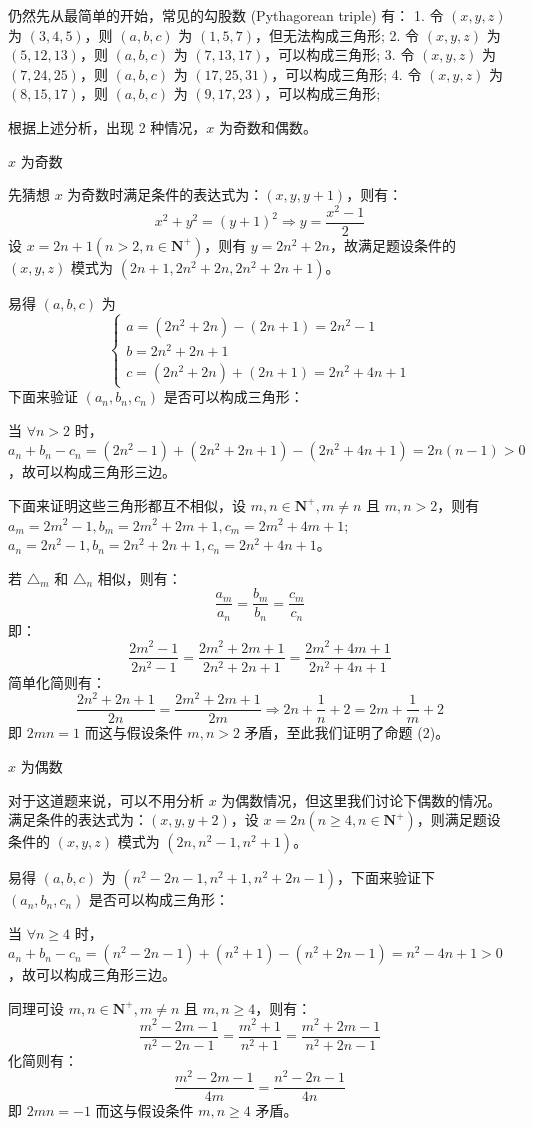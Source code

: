 \begin{solutions}
仍然先从最简单的开始，常见的勾股数 (Pythagorean triple) 有：
1. 令 $(x,y,z)$ 为 $(3,4,5)$，则 $(a,b,c)$ 为 $(1,5,7)$，但无法构成三角形;
2. 令 $(x,y,z)$ 为 $(5,12,13)$，则 $(a,b,c)$ 为 $(7,13,17)$，可以构成三角形;
3. 令 $(x,y,z)$ 为 $(7,24,25)$，则 $(a,b,c)$ 为 $(17,25,31)$，可以构成三角形;
4. 令 $(x,y,z)$ 为 $(8,15,17)$，则 $(a,b,c)$ 为 $(9,17,23)$，可以构成三角形;

根据上述分析，出现 2 种情况，$x$ 为奇数和偶数。

$x$ 为奇数

先猜想 $x$ 为奇数时满足条件的表达式为：$(x,y,y+1)$，则有：
$$
x^2+y^2=(y+1)^2 \Rightarrow y=\frac{x^2-1}{2}
$$
设 $x=2n+1(n>2, n\in \mathbf{N}^+)$，则有 $y=2n^2+2n$，故满足题设条件的 $(x,y,z)$ 模式为 $(2n+1, 2n^2+2n, 2n^2+2n+1)$。

易得 $(a,b,c)$ 为
$$
\begin{cases}
a=(2n^2+2n)-(2n+1)=2n^2-1 \\
b=2n^2+2n+1 \\
c=(2n^2+2n)+(2n+1)=2n^2+4n+1
\end{cases}
$$
下面来验证 $(a_n, b_n, c_n)$ 是否可以构成三角形：

当 $\forall n>2$ 时，
$a_n+b_n-c_n=(2n^2-1)+(2n^2+2n+1)-(2n^2+4n+1)=2n(n-1)>0$，故可以构成三角形三边。

下面来证明这些三角形都互不相似，设 $m,n\in \mathbf{N}^+, m\neq n$ 且 $m,n>2$，则有 $a_m=2m^2-1, b_m=2m^2+2m+1, c_m=2m^2+4m+1$; $a_n=2n^2-1, b_n=2n^2+2n+1, c_n=2n^2+4n+1$。

若 $\triangle_m$ 和 $\triangle_n$ 相似，则有：
$$
\frac{a_m}{a_n}=\frac{b_m}{b_n}=\frac{c_m}{c_n}
$$
即：
$$
\frac{2m^2-1}{2n^2-1}=\frac{2m^2+2m+1}{2n^2+2n+1}=\frac{2m^2+4m+1}{2n^2+4n+1}
$$
简单化简则有：
$$
\frac{2n^2+2n+1}{2n}=\frac{2m^2+2m+1}{2m} \Rightarrow 2n+\frac{1}{n}+2=2m+\frac{1}{m}+2
$$
即 $2mn=1$ 而这与假设条件 $m,n>2$ 矛盾，至此我们证明了命题 (2)。

$x$ 为偶数

对于这道题来说，可以不用分析 $x$ 为偶数情况，但这里我们讨论下偶数的情况。满足条件的表达式为：$(x,y,y+2)$，设 $x=2n(n\ge 4, n\in \mathbf{N}^+)$，则满足题设条件的 $(x,y,z)$ 模式为 $(2n, n^2-1, n^2+1)$。

易得 $(a,b,c)$ 为 $(n^2-2n-1, n^2+1, n^2+2n-1)$，下面来验证下 $(a_n, b_n, c_n)$ 是否可以构成三角形：

当 $\forall n \ge 4$ 时，
$a_n+b_n-c_n=(n^2-2n-1)+(n^2+1)-(n^2+2n-1)=n^2-4n+1>0$，故可以构成三角形三边。

同理可设 $m,n\in \mathbf{N}^+, m\neq n$ 且 $m,n \ge 4$，则有：
$$
\frac{m^2-2m-1}{n^2-2n-1}=\frac{m^2+1}{n^2+1}=\frac{m^2+2m-1}{n^2+2n-1}
$$
化简则有：
$$
\frac{m^2-2m-1}{4m}=\frac{n^2-2n-1}{4n}
$$
即 $2mn=-1$ 而这与假设条件 $m,n \ge 4$ 矛盾。
\end{solutions}